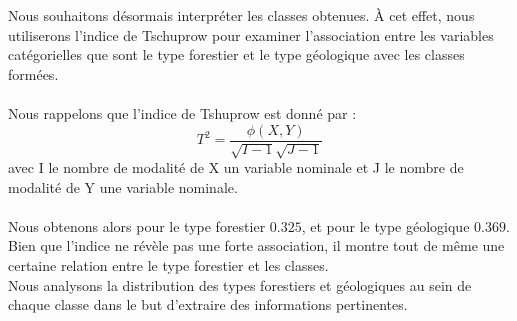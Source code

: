 \documentclass{article}
\begin{document}
Nous souhaitons désormais interpréter les classes obtenues. À cet effet, nous utiliserons l'indice de Tschuprow pour examiner l'association entre les variables catégorielles que sont le type forestier et le type géologique avec les classes formées.
\\
\\
Nous rappelons que l'indice de Tshuprow est donné par : 
\[
T^2 = \frac{\phi (X,Y)}{\sqrt{I-1}\sqrt{J-1}} 
\]
avec I le nombre de modalité de X un variable nominale et J le nombre de modalité de Y une variable nominale.
\\
\\
Nous obtenons alors pour le type forestier $0.325$, et pour le type géologique $0.369$.
\\
Bien que l'indice ne révèle pas une forte association, il montre tout de même une certaine relation entre le type forestier et les classes.
\\
Nous analysons la distribution des types forestiers et géologiques au sein de chaque classe dans le but d'extraire des informations pertinentes.
\\
\end{document}
